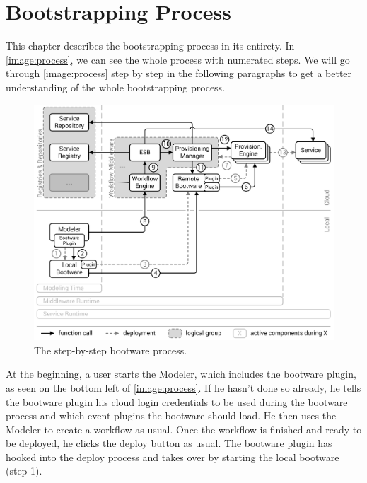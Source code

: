 \chapter{Bootstrapping Process}
\label{process}

This chapter describes the bootstrapping process in its entirety.
In \autoref{image:process}, we can see the whole process with numerated steps.
We will go through \autoref{image:process} step by step in the following paragraphs to get a better understanding of the whole bootstrapping process.

\begin{figure}[!htbp]
	\centering
	\includegraphics[resolution=600]{process/assets/process}
	\caption{The step-by-step bootware process.}
	\label{image:process}
\end{figure}

At the beginning, a user starts the Modeler, which includes the bootware plugin, as seen on the bottom left of \autoref{image:process}.
If he hasn't done so already, he tells the bootware plugin his cloud login credentials to be used during the bootware process and which event plugins the bootware should load.
He then uses the Modeler to create a workflow as usual.
Once the workflow is finished and ready to be deployed, he clicks the deploy button as usual.
The bootware plugin has hooked into the deploy process and takes over by starting the local bootware (step 1).

